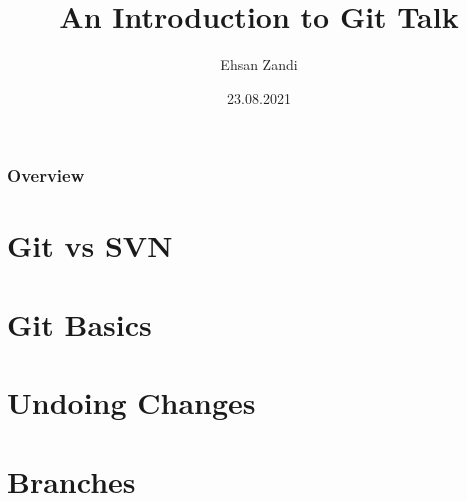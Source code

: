 \documentclass{beamer}
\title[Short title]{An Introduction to Git Talk} %
\author{Ehsan Zandi} %
\institute[DTIT] %
{
Deutsche Telekom IT \\ %
\medskip
ehsan.zandi@telekom.de
}
\date{23.08.2021} %
\begin{document}
\begin{frame}
\titlepage %
\end{frame}

\begin{frame}
\frametitle{Overview} %
\tableofcontents %
\end{frame}


\section{Git vs SVN} 

\section{Git Basics} 
%
%
%
%
\section{Undoing Changes} 

\section{Branches} 
\end{document}
